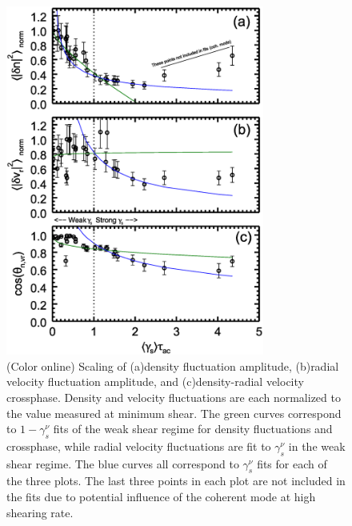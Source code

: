 \documentclass[aip,pop,amsmath,amssymb,peprint,superscriptaddress]{revtex4-1} %
\begin{document}
\begin{figure}[!htbp]
\centerline{
\includegraphics[width=8.5cm]{figure5.eps}}
\caption{\label{fig:densvrcp} (Color online) Scaling of (a)density fluctuation amplitude, (b)radial velocity fluctuation amplitude, and (c)density-radial velocity crossphase. Density and velocity fluctuations are each normalized to the value measured at minimum shear. The green curves correspond to $1-\gamma_{s}^{\nu}$ fits of the weak shear regime for density fluctuations and crossphase, while radial velocity fluctuations are fit to $\gamma_{s}^{\nu}$ in the weak shear regime. The blue curves all correspond to $\gamma_{s}^{\nu}$ fits for each of the three plots. The last three points in each plot are not included in the fits due to potential influence of the coherent mode at high shearing rate.}
\end{figure}
\end{document}
